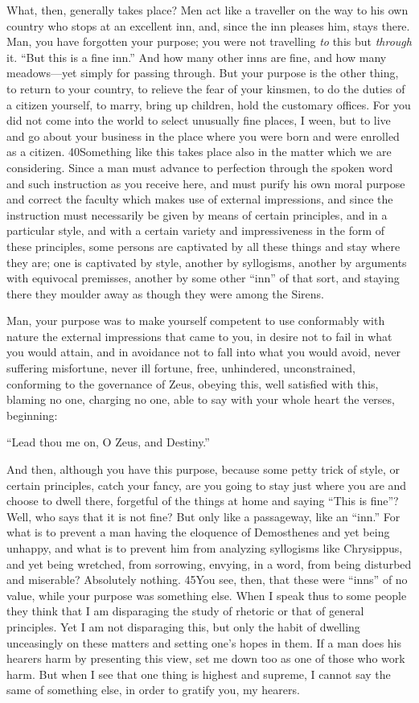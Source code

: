 What, then, generally takes place? Men act like a traveller on the way to his own country who stops at an excellent inn, and, since the inn pleases him, stays there. Man, you have forgotten your purpose; you were not travelling \emph{to} this but \emph{through} it. ``But this is a fine inn.'' And how many other inns are fine, and how many meadows—yet simply for passing through. But your purpose is the other thing, to return to your country, to relieve the fear of your kinsmen, to do the duties of a citizen yourself, to marry, bring up children, hold the customary offices. For you did not come into the world to select unusually fine places, I ween, but to live and go about your business in the place where you were born and were enrolled as a citizen. 40Something like this takes place also in the matter which we are considering. Since a man must advance to perfection through the spoken word and such instruction as you receive here, and must purify his own moral purpose and correct the faculty which makes use of external impressions, and since the instruction must necessarily be given by means of certain principles, and in a particular style, and with a certain variety and impressiveness in the form of these principles, some persons are captivated by all these things and stay where they are; one is captivated by style, another by syllogisms, another by arguments with equivocal premisses, another by some other ``inn'' of that sort, and staying there they moulder away as though they were among the Sirens.

Man, your purpose was to make yourself competent to use conformably with nature the external impressions that came to you, in desire not to fail in what you would attain, and in avoidance not to fall into what you would avoid, never suffering misfortune, never ill fortune, free, unhindered, unconstrained, conforming to the governance of Zeus, obeying this, well satisfied with this, blaming no one, charging no one, able to say with your whole heart the verses, beginning:

``Lead thou me on, O Zeus, and Destiny.''

And then, although you have this purpose, because some petty trick of style, or certain principles, catch your fancy, are you going to stay just where you are and choose to dwell there, forgetful of the things at home and saying ``This is fine''? Well, who says that it is not fine? But only like a passageway, like an ``inn.'' For what is to prevent a man having the eloquence of Demosthenes and yet being unhappy, and what is to prevent him from analyzing syllogisms like Chrysippus, and yet being wretched, from sorrowing, envying, in a word, from being disturbed and miserable? Absolutely nothing. 45You see, then, that these were ``inns'' of no value, while your purpose was something else. When I speak thus to some people they think that I am disparaging the study of rhetoric or that of general principles. Yet I am not disparaging this, but only the habit of dwelling unceasingly on these matters and setting one's hopes in them. If a man does his hearers harm by presenting this view, set me down too as one of those who work harm. But when I see that one thing is highest and supreme, I cannot say the same of something else, in order to gratify you, my hearers.

